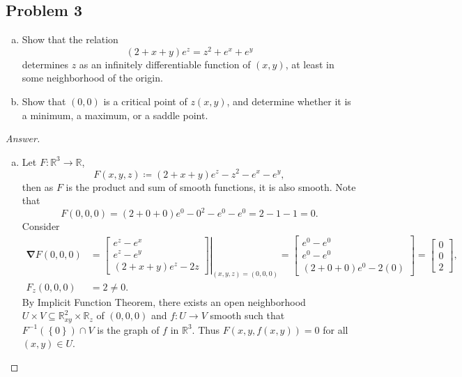 \documentclass[12pt]{article}
\newcommand{\real}{\mathbb{R}}
\newcommand\inv[1]{#1^{-1}}
\newcommand\paren[1]{\left( #1 \right)}
\newcommand\setb[1]{\left \{ #1 \right \}}
\newcommand{\Nabla}{\boldsymbol{\nabla}}
\theoremstyle{definition}
\begin{document}
\subsection{Problem 3}
\begin{enumerate}[(a)]
    \item Show that the relation 
    \[
        (2 + x + y) e^z = z^2 + e^x + e^y
    \]
    determines $z$ as an infinitely differentiable function of $(x,y)$, at least in some neighborhood of the origin. 
    \item Show that $(0,0)$  is a critical point of $z(x,y)$, and determine whether it is a minimum, a maximum, or a saddle point.
\end{enumerate}
\begin{proof}[Answer]
    \noindent
    \begin{enumerate}[(a)]
        \item Let $F : \real^3 \to \real$, 
        \[
            F(x,y,z) \coloneqq (2+x+y) e^z - z^2 - e^x - e^y , 
        \]
        then as $F$ is the product and sum of smooth functions, it is also smooth. Note that 
        \[
            F(0,0,0) = (2+0+0) e^0 - 0^2 - e^0 - e^0 = 2 - 1 - 1 = 0 .
        \]
        Consider 
        \begin{align*}
            \Nabla F(0,0,0) & = 
            \left. 
            \begin{bmatrix}
                e^z - e^x \\ 
                e^z - e^y \\ 
                (2+x+y) e^z - 2z
            \end{bmatrix}
            \right|_{(x,y,z) = (0,0,0)}
            =
            \begin{bmatrix}
                e^0 - e^0 \\ 
                e^0 - e^0 \\ 
                (2+0+0) e^0 - 2(0)
            \end{bmatrix} = 
            \begin{bmatrix}
                0 \\ 
                0 \\ 
                2 
            \end{bmatrix} , \\ 
            F_z(0,0,0) & = 2 \neq 0 . 
        \end{align*}
        By Implicit Function Theorem, there exists an open neighborhood $U \times V \subseteq \real^2_{xy} \times \real_z$ of $(0,0,0)$ and $f : U \to V$ smooth such that $\inv{F} \paren{ \setb{0} } \cap V$ is the graph of $f$ in $\real^3$. Thus $F(x,y,f(x,y)) = 0$ for all $(x,y) \in U$.  

\end{enumerate}
\end{proof}
\end{document}
